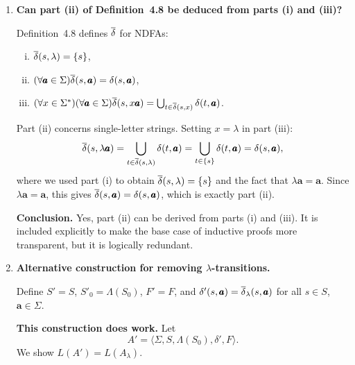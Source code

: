 \begin{enumerate}[{4.}1.]
\textbf{Correctness.}  A word $w\in\Sigma^+$ is accepted by $A$ iff there is a
path $q_0\xrightarrow{\lambda}s_i\xrightarrow{w}f$ for some $s_i\in S_0$ and
$f\in F$; by the $\lambda$-transition $f\xrightarrow{\lambda}q_f$, this same
path exists in $A'$ ending at $q_f$.  Conversely, any accepting path in $A'$
uses the initial $\lambda$-step to some $s_i\in S_0$, processes $w$ within $S$
(by identical transitions), then uses a final $\lambda$-step to $q_f$, which
corresponds to an accepting path in $A$.

If $\lambda\in L(A)$, add the extra $\lambda$-transition
$\delta'(q_0,\lambda)\ni q_f$.  Then $\lambda$ is accepted while $A'$ still has
exactly one start state ($q_0$) and exactly one final state ($q_f$).  Hence
$L(A')=L(A)$ in all cases.

\item \textbf{Can part (ii) of Definition~4.8 be deduced from parts (i) and (iii)?}

Definition~4.8 defines $\overline{\delta}$ for NDFAs:
\begin{enumerate}[(i)]
  \item $\overline{\delta}(s,\lambda)=\{s\}$,
  \item $(\forall\pmb{a}\in\Sigma) \overline{\delta}(s,\pmb{a})=\delta(s,\pmb{a})$,
  \item $(\forall x\in\Sigma^*)(\forall\pmb{a}\in\Sigma) \overline{\delta}(s,x\pmb{a})
        =\bigcup_{t\in\overline{\delta}(s,x)}\delta(t,\pmb{a})$.
\end{enumerate}
Part (ii) concerns single-letter strings.  Setting $x=\lambda$ in part (iii):
\[
  \overline{\delta}(s,\lambda\pmb{a})
  =\bigcup_{t\in\overline{\delta}(s,\lambda)}\delta(t,\pmb{a})
  =\bigcup_{t\in\{s\}}\delta(t,\pmb{a})
  =\delta(s,\pmb{a}),
\]
where we used part (i) to obtain $\overline{\delta}(s,\lambda)=\{s\}$ and the fact that
$\lambda\pmb{a}=\pmb{a}$.  Since $\lambda\pmb{a}=\pmb{a}$, this gives
$\overline{\delta}(s,\pmb{a})=\delta(s,\pmb{a})$, which is exactly part (ii).

\textbf{Conclusion.}  Yes, part (ii) can be derived from parts (i) and (iii).
It is included explicitly to make the base case of inductive proofs more
transparent, but it is logically redundant.

\item \textbf{Alternative construction for removing $\lambda$-transitions.}

Define $S'=S$, $S'_0=\Lambda(S_0)$, $F'=F$, and
$\delta'(s,\pmb{a})=\overline{\delta}_{\lambda}(s,\pmb{a})$ for all $s\in S$, $\pmb{a}\in\Sigma$.

\textbf{This construction does work.}  Let
\[
A'=\langle\Sigma,S,\Lambda(S_0),\delta',F\rangle.
\]
We show $L(A')=L(A_{\lambda})$.


\end{enumerate}
